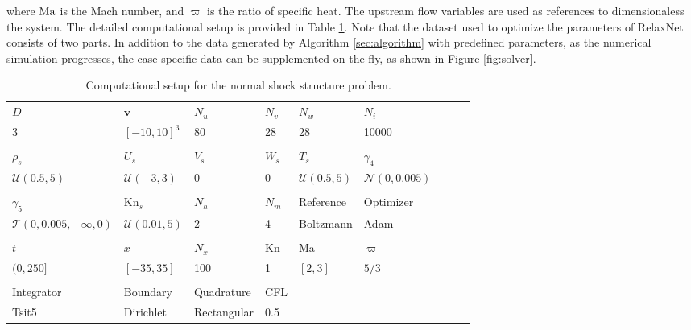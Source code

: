 \documentclass[preprint,3p,12pt,sort&compress]{elsarticle}
\begin{document}
where $\rm Ma$ is the Mach number, and $\varpi$ is the ratio of specific heat.
The upstream flow variables are used as references to dimensionaless the system.
The detailed computational setup is provided in Table \ref{tab:shock}.
Note that the dataset used to optimize the parameters of RelaxNet consists of two parts.
In addition to the data generated by Algorithm \ref{sec:algorithm} with predefined parameters, as the numerical simulation progresses, the case-specific data can be supplemented on the fly, as shown in Figure \ref{fig:solver}.

\begin{table}[htbp]
	\caption{Computational setup for the normal shock structure problem.}
	\centering
	\begin{tabular}{lllllllll} 
	    \hline
	    $D$ & $\mathbf v$ & $N_u$ & $N_v$ & $N_w$ & $N_i$ & \\
	    3 & $[-10,10]^3$ & 80 & 28 & 28 & 10000 & \\
		\rule{0pt}{0ex}\\
		$\rho_s$ & $U_s$ & $V_s$ & $W_s$ & $T_s$ & $\gamma_4$ \\
		$\mathcal U(0.5,5)$ & $\mathcal U(-3,3)$ & $0$ & $0$ & $\mathcal U(0.5,5)$ & $\mathcal N(0,0.005)$ \\
		\rule{0pt}{0ex}\\
		$\gamma_5$ & $\mathrm{Kn}_s$ & $N_h$ & $N_m$ & Reference & Optimizer \\
	    $\mathcal T(0,0.005,-\infty,0)$ & $\mathcal U(0.01,5)$ & 2 & 4 & Boltzmann & Adam \\
		\rule{0pt}{0ex}\\
	    $t$ & $x$ & $N_x$ & Kn & Ma & $\varpi$ \\
		$(0,250]$ & $[-35,35]$ & 100 & 1 & $[2,3]$ & $5/3$ \\
		\rule{0pt}{0ex}\\
		Integrator & Boundary & Quadrature & CFL \\
		Tsit5 & Dirichlet & Rectangular & 0.5 \\
		\hline
	\end{tabular} 
	\label{tab:shock}
\end{table}
\end{document}
